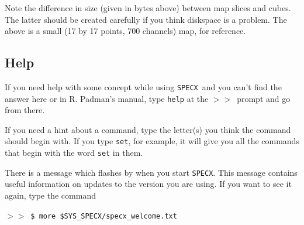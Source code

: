 \documentclass[11pt,twoside]{starlink}
\providecommand{\SPECX}{\texttt{SPECX}}
\providecommand{\SP}{{$>\!>$}}
\begin{document}
Note the difference in size (given in bytes above) between map slices
and cubes. The latter should be created carefully if you think
diskspace is a problem. The above is a small (17 by 17 points, 700
channels) map, for reference.

\subsection{Help}
\label{sec:specx_14}

If you need help with some concept while using \SPECX\ and you can't
find the answer here or in R. Padman's manual, type \texttt{help} at the
\SP\ prompt and go from there.

If you need a hint about a command, type the letter(s) you think the
command should begin with.  If you type \texttt{set}, for example, it
will give you all the commands that begin with the word \texttt{set} in
them.

There is a message which flashes by when you start \SPECX . This message
contains useful information on updates to the version you are using.
If you want to see it again, type the command

\SP\ \verb|$ more $SYS_SPECX/specx_welcome.txt|

\typeout{  }
\typeout{*****************************************************}
\typeout{  }
\typeout{  }
\typeout{*****************************************************}
\typeout{  }
\end{document}
